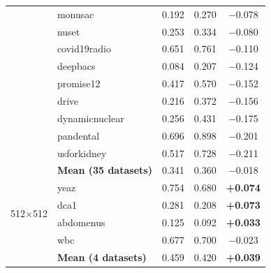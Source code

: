 \documentclass[runningheads]{llncs}
\begin{document}
\begin{table}[t]
\begin{tabular}{llccc}
 & monusac & 0.192 & 0.270 & $-$0.078 \\
 & nuset & 0.253 & 0.334 & $-$0.080 \\
 & covid19radio & 0.651 & 0.761 & $-$0.110 \\
 & deepbacs & 0.084 & 0.207 & $-$0.124 \\
 & promise12 & 0.417 & 0.570 & $-$0.152 \\
 & drive & 0.216 & 0.372 & $-$0.156 \\
 & dynamicnuclear & 0.256 & 0.431 & $-$0.175 \\
 & pandental & 0.696 & 0.898 & $-$0.201 \\
 & usforkidney & 0.517 & 0.728 & $-$0.211 \\
& \textbf{Mean (35 datasets)} & 0.341 & 0.360 & $-$0.018 \\
\midrule
\multirow{4}{*}{512$\times$512} & yeaz & 0.754 & 0.680 & \textbf{+0.074} \\
 & dca1 & 0.281 & 0.208 & \textbf{+0.073} \\
 & abdomenus & 0.125 & 0.092 & \textbf{+0.033} \\
 & wbc & 0.677 & 0.700 & $-$0.023 \\
& \textbf{Mean (4 datasets)} & 0.459 & 0.420 & \textbf{+0.039} \\
\midrule
\bottomrule
\end{tabular}
\end{table}
\end{document}
